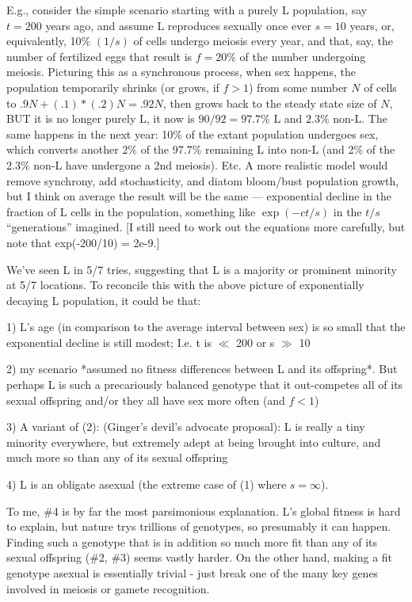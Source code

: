 \documentclass{article}\usepackage[]{graphicx}\usepackage[]{color}
\begin{document}
E.g., consider the simple scenario starting with a purely L population, say $t=200$ years ago, and
assume L reproduces sexually once ever $s=10$ years, or, equivalently, 10\% $(1/s)$ of cells undergo
meiosis every year, and that, say, the number of fertilized eggs that result is $f=20\%$ of the
number undergoing meiosis.  Picturing this as a synchronous process, when sex happens, the
population temporarily shrinks (or grows, if $f>1$) from some number $N$ of cells to
$.9N + (.1)*(.2)N = .92N$, then grows back to the steady state size of $N$, BUT it is no longer
purely L, it now is $90/92 = 97.7\%$ L and $2.3\%$ non-L.  The same happens in the next year: 10\%
of the extant population undergoes sex, which converts another 2\% of the 97.7\% remaining L into
non-L (and 2\% of the 2.3\% non-L have undergone a 2nd meiosis).  Etc.  A more realistic model would
remove synchrony, add stochasticity, and diatom bloom/bust population growth, but I think on average
the result will be the same --- exponential decline in the fraction of L cells in the population,
something like $\exp(-ct/s)$ in the $t/s$ “generations” imagined.  [I still need to work out the
equations more carefully, but note that exp(-200/10) = 2e-9.]

We’ve seen L in 5/7 tries, suggesting that L is a majority or prominent minority at 5/7
locations. To reconcile this with the above picture of exponentially decaying L population, it could
be that:

1) L’s age (in comparison to the average interval between sex) is so small that the exponential
decline is still modest; I.e. t is $\ll$ 200 or s $\gg$ 10

2) my scenario *assumed no fitness differences between L and its offspring*.  But perhaps L is such
a precariously balanced genotype that it out-competes all of its sexual offspring and/or they all
have sex more often (and $f < 1$)

3) A variant of (2): (Ginger’s devil’s advocate proposal): L is really a tiny minority everywhere,
but extremely adept at being brought into culture, and much more so than any of its sexual offspring

4) L is an obligate asexual (the extreme case of (1) where $s=\infty$).

To me, \#4 is by far the most parsimonious explanation. L’s global fitness is hard to explain, but
nature trys trillions of genotypes, so presumably it can happen.  Finding such a genotype that is in
addition so much more fit than any of its sexual offspring (\#2, \#3) seems vastly harder.  On the
other hand, making a fit genotype asexual is essentially trivial - just break one of the many key
genes involved in meiosis or gamete recognition.
\end{document}
